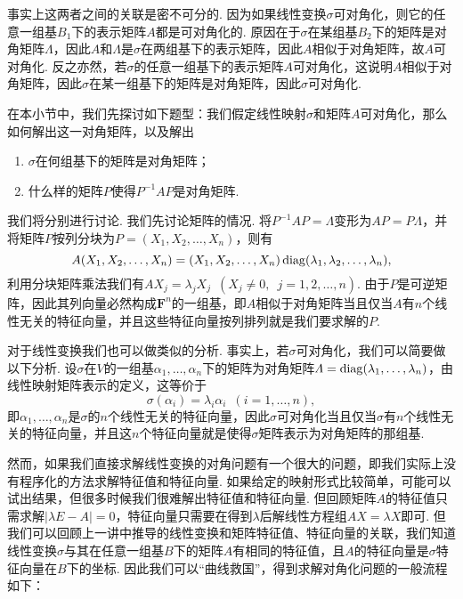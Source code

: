 事实上这两者之间的关联是密不可分的. 因为如果线性变换$\sigma$可对角化，则它的任意一组基$B_1$下的表示矩阵$A$都是可对角化的. 原因在于$\sigma$在某组基$B_2$下的矩阵是对角矩阵$\varLambda$，因此$A$和$\varLambda$是$\sigma$在两组基下的表示矩阵，因此$A$相似于对角矩阵，故$A$可对角化. 反之亦然，若$\sigma$的任意一组基下的表示矩阵$A$可对角化，这说明$A$相似于对角矩阵，因此$\sigma$在某一组基下的矩阵是对角矩阵，因此$\sigma$可对角化.

在本小节中，我们先探讨如下题型：我们假定线性映射$\sigma$和矩阵$A$可对角化，那么如何解出这一对角矩阵，以及解出
\begin{enumerate}
    \item $\sigma$在何组基下的矩阵是对角矩阵；

    \item 什么样的矩阵$P$使得$P^{-1}AP$是对角矩阵.
\end{enumerate}

我们将分别进行讨论. 我们先讨论矩阵的情况. 将$P^{-1}AP=\varLambda$变形为$AP=P\varLambda$，并将矩阵$P$按列分块为$P=(X_1,X_2,\ldots,X_n)$，则有
\[A(X_1,X_2,\ldots,X_n)=(X_1,X_2,\ldots,X_n)\operatorname{diag}(\lambda_1,\lambda_2,\ldots,\lambda_n),\]
利用分块矩阵乘法我们有$AX_j=\lambda_jX_j\enspace(X_j\neq 0,\enspace j=1,2,\ldots,n)$. 由于$P$是可逆矩阵，因此其列向量必然构成$\mathbf{F}^n$的一组基，即$A$相似于对角矩阵当且仅当$A$有$n$个线性无关的特征向量，并且这些特征向量按列排列就是我们要求解的$P$.

对于线性变换我们也可以做类似的分析. 事实上，若$\sigma$可对角化，我们可以简要做以下分析. 设$\sigma$在$V$的一组基$\alpha_1,\ldots,\alpha_n$下的矩阵为对角矩阵$\varLambda=\operatorname{diag}(\lambda_1,\ldots,\lambda_n)$，由线性映射矩阵表示的定义，这等价于
\[\sigma(\alpha_i)=\lambda_i\alpha_i\enspace(i=1,\ldots,n),\]
即$\alpha_1,\ldots,\alpha_n$是$\sigma$的$n$个线性无关的特征向量，因此$\sigma$可对角化当且仅当$\sigma$有$n$个线性无关的特征向量，并且这$n$个特征向量就是使得$\sigma$矩阵表示为对角矩阵的那组基.

然而，如果我们直接求解线性变换的对角问题有一个很大的问题，即我们实际上没有程序化的方法求解特征值和特征向量. 如果给定的映射形式比较简单，可能可以试出结果，但很多时候我们很难解出特征值和特征向量. 但回顾矩阵$A$的特征值只需求解$|\lambda E-A|=0$，特征向量只需要在得到$\lambda$后解线性方程组$AX=\lambda X$即可. 但我们可以回顾上一讲中推导的线性变换和矩阵特征值、特征向量的关联，我们知道线性变换$\sigma$与其在任意一组基$B$下的矩阵$A$有相同的特征值，且$A$的特征向量是$\sigma$特征向量在$B$下的坐标. 因此我们可以``曲线救国''，得到求解对角化问题的一般流程如下：


